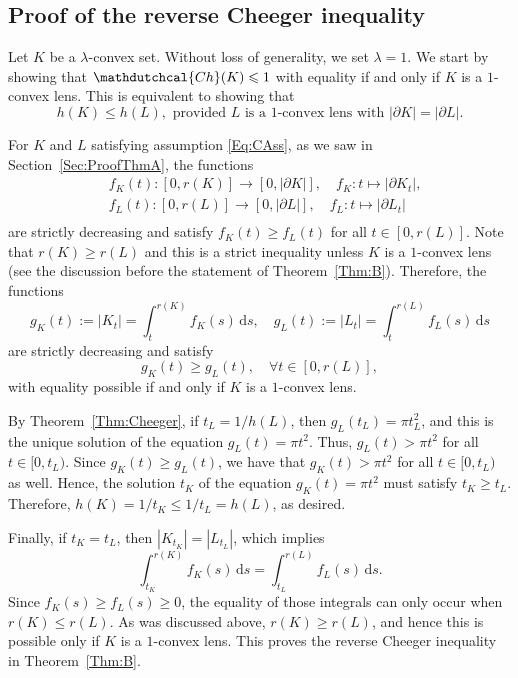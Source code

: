 \documentclass[11pt, oneside]{amsart}
\newcommand{\Ch}{\mathdutchcal{Ch}}
\renewcommand{\ge}{\geqslant}
\renewcommand{\le}{\leqslant}
\theoremstyle{theorem}
\theoremstyle{Intro}
\theoremstyle{definition}
\theoremstyle{remark}
\theoremstyle{claim}
\numberwithin{equation}{section}
\begin{document}
\subsection{Proof of the reverse Cheeger inequality}

Let $K$ be a $\lambda$-convex set. Without loss of generality, we set $\lambda = 1$. We start by showing that $\Ch(K) \le 1$ with equality if and only if $K$ is a $1$-convex lens. This is equivalent to showing that 
\begin{equation}
\label{Eq:CAss}
h(K) \le h(L), \text{ provided }L\text{ is a $1$-convex lens with }|\partial K|=|\partial L|.
\end{equation}

For $K$ and $L$ satisfying assumption \eqref{Eq:CAss}, as we saw in Section~\ref{Sec:ProofThmA}, the functions
\begin{equation*}
    \begin{aligned}
        &f_K(t) \colon [0, r(K)] \to \left[0, |\partial K|\right], \quad f_K \colon t \mapsto |\partial K_t|,\\   
        &f_L(t) \colon [0, r(L)] \to \left[0, |\partial L|\right], \quad f_L \colon t \mapsto |\partial L_t|\\  
    \end{aligned}
\end{equation*}
are strictly  decreasing and satisfy $f_K(t) \ge f_L(t)$ for all $t \in [0, r(L)]$. Note that $r(K) \ge r(L)$ and this is a strict inequality unless $K$ is a $1$-convex lens (see the discussion before the statement of Theorem~\ref{Thm:B}). Therefore, the functions
\[
g_K(t) := |K_t| = \int_t^{r(K)} f_K(s) \,\text{d}s, \quad g_L(t) := |L_t| = \int_t^{r(L)} f_L(s) \,\text{d}s
\]
are strictly decreasing and satisfy
\[
g_K(t) \ge g_L(t), \quad \forall t \in [0,r(L)],
\]
with equality possible if and only if $K$ is a $1$-convex lens. 

By Theorem~\ref{Thm:Cheeger}, if $t_L = 1/h(L)$, then $g_L(t_L) = \pi t_L^2$, and this is the unique solution of the equation $g_L(t) = \pi t^2$. Thus, $g_L(t) > \pi t^2$ for all $t \in [0, t_L)$. Since $g_K(t) \ge g_L(t)$, we have that $g_K(t) > \pi t^2$ for all $t \in [0, t_L)$ as well. Hence, the solution $t_K$ of the equation $g_K(t) = \pi t^2$ must satisfy $t_K \ge t_L$. Therefore, $h(K) = 1/t_K \le 1/t_L = h(L)$, as desired. 

Finally, if $t_K = t_L$, then $|K_{t_K}| = |L_{t_L}|$, which implies 
\[
\int_{t_K}^{r(K)} f_K(s) \,\text{d}s = \int_{t_L}^{r(L)} f_L(s) \,\text{d}s.
\]
Since $f_K(s) \ge f_L(s)\ge 0$, the equality of those integrals can only occur when $r(K) \le r(L)$. As was discussed above, $r(K) \ge r(L)$, and hence this is possible only if $K$ is a $1$-convex lens. This proves the reverse Cheeger inequality in Theorem~\ref{Thm:B}. 
\end{document}
